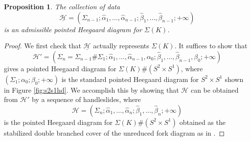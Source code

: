 \documentclass[11pt]{article}
\theoremstyle{plain} \newtheorem{thm}{Theorem}[subsection]
\theoremstyle{plain} \newtheorem{cor}[thm]{Corollary}
\theoremstyle{plain} \newtheorem{prop}[thm]{Proposition}
\theoremstyle{plain} \newtheorem{conj}[thm]{Conjecture}
\theoremstyle{plain} \newtheorem{lem}[thm]{Lemma}
\theoremstyle{definition} \newtheorem{df}[thm]{Definition}
\theoremstyle{remark} \newtheorem{rmk}[thm]{Remark}
\theoremstyle{remark} \newtheorem{obs}[thm]{Observation}
\newcommand{\DBCs}[1]{\Sigma(#1)\#(S^{2}\times S^{1})}
\newcommand{\DBC}[1]{\Sigma(#1)}
\newcommand{\h}{\mathcal{H}}
\newcommand{\red}[1]{\underline{#1}}
\newcommand{\ah}{\widehat{\alpha}}
\newcommand{\bh}{\widehat{\beta}}
\numberwithin{equation}{section}
\begin{document}
\begin{prop}\label{prop:DBCred}
The collection of data
\begin{equation*}
\red{\h} = (\Sigma_{n-1}; \ah_{1}, \ldots , \ah_{n-1} ; \bh_{1}, \ldots , \bh_{n-1} ; +\infty  )
\end{equation*}
is an admissible pointed Heegaard diagram for $\DBC{K}$.
\end{prop}
\begin{proof}

%


We first check that $\red{\h}$ actually represents $\DBC{K}$.  It suffices to show that
\begin{equation*}
\h' = \left(\Sigma_{n} = \Sigma_{n-1} \# \Sigma_{1}; \ah_{1}, \ldots , \ah_{n-1}, \alpha_{0} ; \bh_{1}, \ldots , \bh_{n-1}, \beta_{0} ; +\infty\right)
\end{equation*}
gives a pointed Heegaard diagram for $\DBCs{K}$, where $\left(\Sigma_{1}; \alpha_{0}; \beta_{0}; +\infty\right)$ is the standard pointed Heegaard diagram for $S^{2} \times S^{1}$ shown in Figure \ref{fig:s2s1hd}.  We accomplish this by showing that $\h$ can be obtained from $\h'$ by a sequence of handleslides, where 
$$\h = \left( \Sigma_n; \ah_1, \ldots, \ah_n; \bh_1, \ldots, \bh_{n}; +\infty \right)$$
is the pointed Heegaard diagram for $\DBCs{K}$ obtained as the stabilized double branched cover of the unreduced fork diagram as in \cite{et:R}.


\end{proof}
\end{document}
